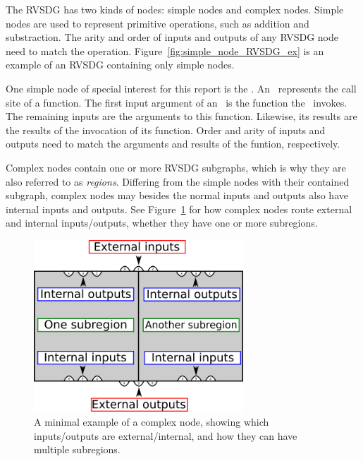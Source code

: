 The RVSDG has two kinds of nodes: simple nodes and complex nodes. Simple nodes
are used to represent primitive operations, such as addition and substraction.
The arity and order of inputs and outputs of any RVSDG node need to match the
operation. Figure~\ref{fig:simple_node_RVSDG_ex} is an example of an RVSDG
containing only simple nodes.

One simple node of special interest for this report is the \applyNode . An
\applyNode~represents the call site of a function. The first input argument of
an \applyNode~is the function the \applyNode~invokes. The remaining inputs are
the arguments to this function. Likewise, its results are the results of the
invocation of its function. Order and arity of inputs and outputs need to match
the arguments and results of the funtion, respectively.

Complex nodes contain one or more RVSDG subgraphs, which is why they are also
referred to as \textit{regions}. Differing from the simple nodes with their
contained subgraph, complex nodes may besides the normal inputs and outputs also
have internal inputs and outputs. See Figure~\ref{fig:complex_node_mapping_ex}
for how complex nodes route external and internal inputs/outputs, whether they
have one or more subregions.

\begin{figure}[H]
	\centering
	\includegraphics[width=0.7\textwidth]{figures/complex_node_mapping_ex}
	\caption{A minimal example of a complex node, showing which inputs/outputs
are external/internal, and how they can have multiple subregions.}
	\label{fig:complex_node_mapping_ex}
\end{figure}



